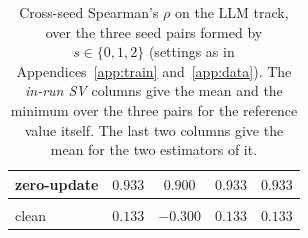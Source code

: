 \documentclass[letterpaper]{article} %
\providecommand{\ourpanelsep}{2pt}
\theoremstyle{definition}
\begin{document}
\begin{table}[!t]
\begin{tabular}{lcccB}
zero-update & $0.933$ & $0.900$ & $0.933$ & $0.933$ \\
\hline
\noalign{\vskip\ourpanelsep}
 \\[\ourpanelsep]
clean & $0.133$ & $-0.300$ & $0.133$ & $0.133$ \\
\hline
\end{tabular}
\caption{Cross-seed Spearman's $\rho$ on the LLM track, over the three seed
pairs formed by $s \in \{0, 1, 2\}$ (settings as in
Appendices~\ref{app:train} and~\ref{app:data}). The \emph{in-run SV} columns give
the mean and the minimum over the three pairs for the reference value itself.
The last two columns give the mean for the two estimators of it.}
\label{tab:target-stability}
\end{table}
\end{document}
